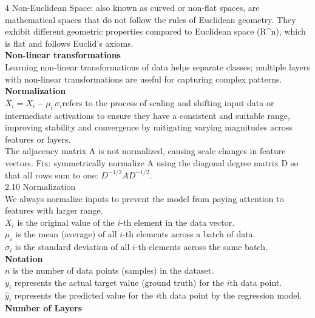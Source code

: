 \documentclass[8pt]{extarticle}
\begin{document}
\begin{multicols}{4}
Non-Euclidean Space: also known as curved or non-flat spaces, are mathematical spaces that do not follow the rules of Euclidean geometry. They exhibit different geometric properties compared to Euclidean space (R\textasciicircum{}n), which is flat and follows Euclid's axioms.\\
\vspace{2pt}\textbf{Non-linear transformations}\\
Learning non-linear transformations of data helps separate classes; multiple layers with non-linear transformations are useful for capturing complex patterns.\\
\vspace{2pt}\textbf{Normalization}\\
$X_i = X_i - \mu_i \, \sigma_i$\Normalization refers to the process of scaling and shifting input data or intermediate activations to ensure they have a consistent and suitable range, improving stability and convergence by mitigating varying magnitudes across features or layers.\\
The adjacency matrix A is not normalized, causing scale changes in feature vectors. Fix: symmetrically normalize A using the diagonal degree matrix D so that all rows sum to one: $D^{-1/2} A D^{-1/2}$.\\
2.10 Normalization\\
We always normalize inputs to prevent the model from paying attention to features with larger range.\\
$X_i$ is the original value of the $ i$-th element in the data vector.\\
$\mu_i$ is the mean (average) of all $ i$-th elements across a batch of data.\\
$\sigma_i$ is the standard deviation of all $ i$-th elements across the same batch.\\
\vspace{2pt}\textbf{Notation}\\
$n$ is the number of data points (samples) in the dataset.\\
$y_i$ represents the actual target value (ground truth) for the $ i$th data point.\\
$\hat{y}_i$ represents the predicted value for the $ i$th data point by the regression model.\\
\vspace{2pt}\textbf{Number of Layers}\\


\end{multicols}
\end{document}
